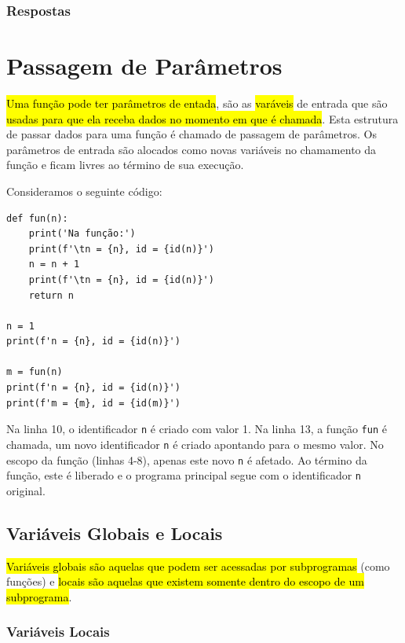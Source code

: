 \ifisbook
\subsubsection{Respostas}
\shipoutAnswer
\fi


\section{Passagem de Parâmetros}\label{cap_fun_sec_params}

\hl{Uma função pode ter parâmetros de entada}, são as \hl{varáveis} de entrada que são \hl{usadas para que ela receba dados no momento em que é chamada}. Esta estrutura de passar dados para uma função é chamado de passagem de parâmetros. Os parâmetros de entrada são alocados como novas variáveis no chamamento da função e ficam livres ao término de sua execução.

\begin{ex}
  Consideramos o seguinte código:

\begin{lstlisting}
def fun(n):
    print('Na função:')
    print(f'\tn = {n}, id = {id(n)}')
    n = n + 1
    print(f'\tn = {n}, id = {id(n)}')
    return n

n = 1
print(f'n = {n}, id = {id(n)}')

m = fun(n)
print(f'n = {n}, id = {id(n)}')
print(f'm = {m}, id = {id(m)}')
\end{lstlisting}
  
Na linha 10, o identificador \lstinline+n+ é criado com valor 1. Na linha 13, a função \lstinline+fun+ é chamada, um novo identificador \lstinline+n+ é criado apontando para o mesmo valor. No escopo da função (linhas 4-8), apenas este novo \lstinline+n+ é afetado. Ao término da função, este é liberado e o programa principal segue com o identificador \lstinline+n+ original.
\end{ex}

\subsection{Variáveis Globais e Locais}

\hl{Variáveis globais são aquelas que podem ser acessadas por subprogramas} (como funções) e \hl{locais são aquelas que existem somente dentro do escopo de um subprograma}.

\subsubsection{Variáveis Locais}

